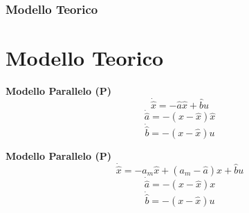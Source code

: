 \documentclass{beamer}
\begin{document}
\begin{frame}
    \frametitle{Modello Teorico}
    \section{Modello Teorico}
    \begin{minipage}{0.45\textwidth}
        \begin{center}
            \textbf{Modello Parallelo (P)}
            \begin{equation*}
                \dot{\hat{x}}=-\hat{a}\hat{x}+\hat{b}u
            \end{equation*}
            \begin{equation*}
                \dot{\hat{a}}=-(x-\hat{x})\hat{x}
            \end{equation*}
            \begin{equation*}
                \dot{\hat{b}}=-(x-\hat{x})u
            \end{equation*}
        \end{center}
    \end{minipage}
    \begin{minipage}{0.45\textwidth}
        \begin{center}
            \textbf{Modello Parallelo (P)}
            \begin{equation*}
                \dot{\hat{x}}=-a_{m}\hat{x}+(a_{m}-\hat{a})x+\hat{b}u
            \end{equation*}
            \begin{equation*}
                \dot{\hat{a}}=-(x-\hat{x})x
            \end{equation*}
            \begin{equation*}
                \dot{\hat{b}}=-(x-\hat{x})u
            \end{equation*}
        \end{center}
    \end{minipage}
\end{frame}
\end{document}
